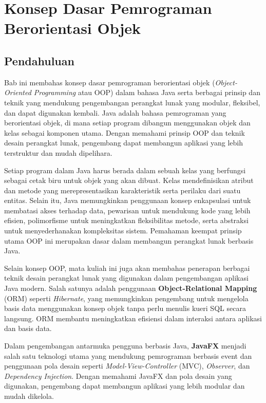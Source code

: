 \chapter{Konsep Dasar Pemrograman Berorientasi Objek}

\section{Pendahuluan}

Bab ini membahas konsep dasar pemrograman berorientasi objek (\textit{Object-Oriented Programming} atau OOP) dalam bahasa Java serta berbagai prinsip dan teknik yang mendukung pengembangan perangkat lunak yang modular, fleksibel, dan dapat digunakan kembali. Java adalah bahasa pemrograman yang berorientasi objek, di mana setiap program dibangun menggunakan objek dan kelas sebagai komponen utama. Dengan memahami prinsip OOP dan teknik desain perangkat lunak, pengembang dapat membangun aplikasi yang lebih terstruktur dan mudah dipelihara.

Setiap program dalam Java harus berada dalam sebuah kelas yang berfungsi sebagai cetak biru untuk objek yang akan dibuat. Kelas mendefinisikan atribut dan metode yang merepresentasikan karakteristik serta perilaku dari suatu entitas. Selain itu, Java memungkinkan penggunaan konsep enkapsulasi untuk membatasi akses terhadap data, pewarisan untuk mendukung kode yang lebih efisien, polimorfisme untuk meningkatkan fleksibilitas metode, serta abstraksi untuk menyederhanakan kompleksitas sistem. Pemahaman keempat prinsip utama OOP ini merupakan dasar dalam membangun perangkat lunak berbasis Java.

Selain konsep OOP, mata kuliah ini juga akan membahas penerapan berbagai teknik desain perangkat lunak yang digunakan dalam pengembangan aplikasi Java modern. Salah satunya adalah penggunaan \textbf{Object-Relational Mapping} (ORM) seperti \textit{Hibernate}, yang memungkinkan pengembang untuk mengelola basis data menggunakan konsep objek tanpa perlu menulis kueri SQL secara langsung. ORM membantu meningkatkan efisiensi dalam interaksi antara aplikasi dan basis data.

Dalam pengembangan antarmuka pengguna berbasis Java, \textbf{JavaFX} menjadi salah satu teknologi utama yang mendukung pemrograman berbasis event dan penggunaan pola desain seperti \textit{Model-View-Controller} (MVC), \textit{Observer}, dan \textit{Dependency Injection}. Dengan memahami JavaFX dan pola desain yang digunakan, pengembang dapat membangun aplikasi yang lebih modular dan mudah dikelola.


